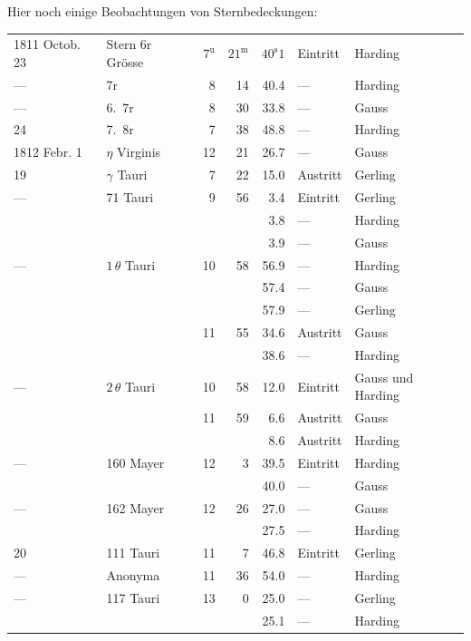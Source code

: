 \par\indent Hier noch einige Beobachtungen von Sternbedeckungen:

\begin{center}\fontsize{9}{11}\selectfont\setlength{\tabcolsep}{2pt}\renewcommand{\arraystretch}{1.15}\begin{tabular}{llrrrll}
1811 Octob. 23 & Stern 6r Grösse & $7^{\mathrm u}$ & $21^{\mathrm m}$ & $40^{\mathrm s}1$ & Eintritt & Harding\\
— & 7r & 8 & 14 & 40.4 & — & Harding\\
— & 6.\ 7r & 8 & 30 & 33.8 & — & Gauss\\
24 & 7.\ 8r & 7 & 38 & 48.8 & — & Harding\\
1812 Febr. 1 & $\eta$ Virginis & 12 & 21 & 26.7 & — & Gauss\\
19 & $\gamma$ Tauri & 7 & 22 & 15.0 & Austritt & Gerling\\
— & 71 Tauri & 9 & 56 & 3.4 & Eintritt & Gerling\\
 &  &  &  & 3.8 & — & Harding\\
 &  &  &  & 3.9 & — & Gauss\\
— & $1\,\theta$ Tauri & 10 & 58 & 56.9 & — & Harding\\
 &  &  &  & 57.4 & — & Gauss\\
 &  &  &  & 57.9 & — & Gerling\\
 &  & 11 & 55 & 34.6 & Austritt & Gauss\\
 &  &  &  & 38.6 & — & Harding\\
— & $2\,\theta$ Tauri & 10 & 58 & 12.0 & Eintritt & Gauss und Harding\\
 &  & 11 & 59 & 6.6 & Austritt & Gauss\\
 &  &  &  & 8.6 & Austritt & Harding\\
— & 160 Mayer & 12 & 3 & 39.5 & Eintritt & Harding\\
 &  &  &  & 40.0 & — & Gauss\\
— & 162 Mayer & 12 & 26 & 27.0 & — & Gauss\\
 &  &  &  & 27.5 & — & Harding\\
20 & 111 Tauri & 11 & 7 & 46.8 & Eintritt & Gerling\\
— & Anonyma & 11 & 36 & 54.0 & — & Harding\\
— & 117 Tauri & 13 & 0 & 25.0 & — & Gerling\\
 &  &  &  & 25.1 & — & Harding\\
\end{tabular}\end{center}


